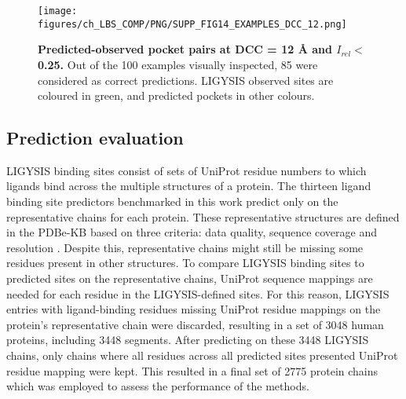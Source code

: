 \begin{figure}[ht!]
    \centering
    \texttt{[image: figures/ch\_LBS\_COMP/PNG/SUPP\_FIG14\_EXAMPLES\_DCC\_12.png]}
    \caption[Predicted-observed pocket pairs at DCC = 12 \AA{} and $I_{rel} <$ 0.25]{\textbf{Predicted-observed pocket pairs at DCC = 12 \AA{} and $I_{rel} <$ 0.25.} Out of the 100 examples visually inspected, 85 were considered as correct predictions. LIGYSIS observed sites are coloured in green, and predicted pockets in other colours.}
    \label{fig:DCC_12_examples}
\end{figure}
\FloatBarrier

\subsection{Prediction evaluation}

LIGYSIS binding sites consist of sets of UniProt residue numbers to which ligands bind across the multiple structures of a protein. The thirteen ligand binding site predictors benchmarked in this work predict only on the representative chains for each protein. These representative structures are defined in the PDBe-KB based on three criteria: data quality, sequence coverage and resolution \cite{ELLAWAY_2024_CONFORMATIONS}. Despite this, representative chains might still be missing some residues present in other structures. To compare LIGYSIS binding sites to predicted sites on the representative chains, UniProt sequence mappings are needed for each residue in the LIGYSIS-defined sites. For this reason, LIGYSIS entries with ligand-binding residues missing UniProt residue mappings on the protein’s representative chain were discarded, resulting
in a set of 3048 human proteins, including 3448 segments. After predicting on these 3448 LIGYSIS chains, only chains where all residues across all predicted sites presented UniProt residue mapping were kept. This resulted in a final set of 2775 protein chains which was employed to assess the performance of the methods.

